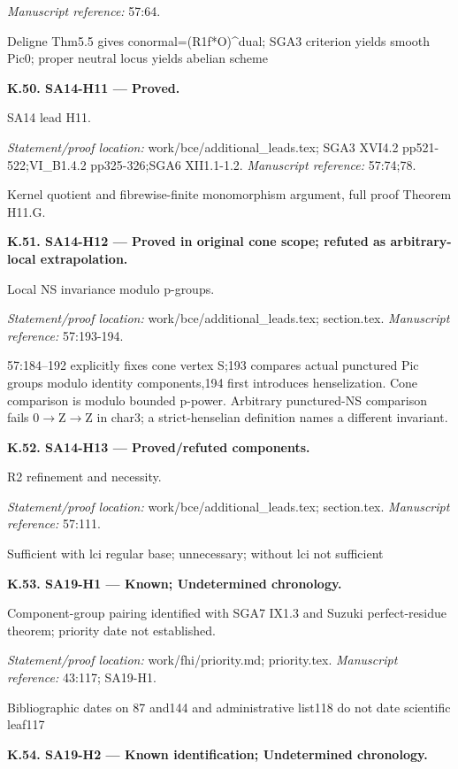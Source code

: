 \emph{Manuscript reference:} 57:64.
\par Deligne Thm5.5 gives conormal=(R1f*O)\textasciicircum{}dual; SGA3 criterion yields smooth Pic0; proper neutral locus yields abelian scheme
\par\medskip\noindent\textbf{K.50. SA14-H11 --- Proved.}\par
SA14 lead H11.
\par\emph{Statement/proof location:} work/bce/additional\_leads.tex; SGA3 XVI4.2 pp521-522;VI\_B1.4.2 pp325-326;SGA6 XII1.1-1.2.
\emph{Manuscript reference:} 57:74;78.
\par Kernel quotient and fibrewise-finite monomorphism argument, full proof Theorem H11.G.
\par\medskip\noindent\textbf{K.51. SA14-H12 --- Proved in original cone scope; refuted as arbitrary-local extrapolation.}\par
Local NS invariance modulo p-groups.
\par\emph{Statement/proof location:} work/bce/additional\_leads.tex; section.tex.
\emph{Manuscript reference:} 57:193-194.
\par 57:184–192 explicitly fixes cone vertex S;193 compares actual punctured Pic groups modulo identity components,194 first introduces henselization. Cone comparison is modulo bounded p-power. Arbitrary punctured-NS comparison fails 0\ensuremath{\to}Z\ensuremath{\to}Z in char3; a strict-henselian definition names a different invariant.
\par\medskip\noindent\textbf{K.52. SA14-H13 --- Proved/refuted components.}\par
R2 refinement and necessity.
\par\emph{Statement/proof location:} work/bce/additional\_leads.tex; section.tex.
\emph{Manuscript reference:} 57:111.
\par Sufficient with lci regular base; unnecessary; without lci not sufficient
\par\medskip\noindent\textbf{K.53. SA19-H1 --- Known; Undetermined chronology.}\par
Component-group pairing identified with SGA7 IX1.3 and Suzuki perfect-residue theorem; priority date not established.
\par\emph{Statement/proof location:} work/fhi/priority.md; priority.tex.
\emph{Manuscript reference:} 43:117; SA19-H1.
\par Bibliographic dates on 87 and144 and administrative list118 do not date scientific leaf117
\par\medskip\noindent\textbf{K.54. SA19-H2 --- Known identification; Undetermined chronology.}\par
